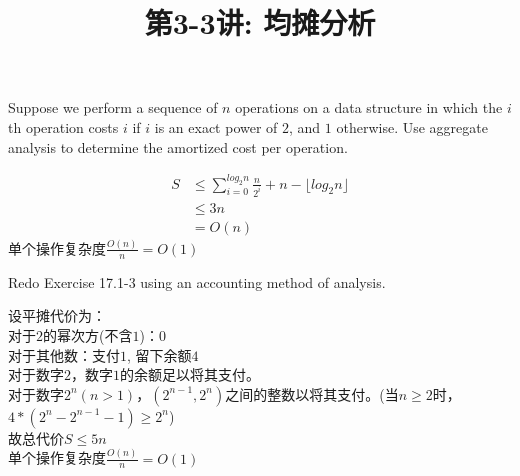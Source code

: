 \documentclass[a4paper, justified]{tufte-handout}
\title{第3-3讲: 均摊分析}
\date{\zhtoday} %
\begin{document}
\maketitle
\noplagiarism %
\begin{abstract}
\end{abstract}
\beginrequired

\begin{problem}[TC 17.1-3]
Suppose we perform a sequence of $n$ operations on a data structure in which the $i$ th operation costs $i$ if $i$ is an exact power of $2$, and $1$ otherwise. Use aggregate analysis to determine the amortized cost per operation.
\end{problem}

\begin{solution}
    \[
        \begin{aligned}
            S & \leq\sum\limits_{i = 0}^{log_2n}\frac{n}{2^i} + n - \lfloor log_2n\rfloor \\
              & \leq 3n                                                                   \\
              & = O(n)
        \end{aligned}
    \]
    单个操作复杂度$\frac{O(n)}{n}=O(1)$
\end{solution}

\begin{problem}[TC 17.2-2]
Redo Exercise 17.1-3 using an accounting method of analysis.
\end{problem}

\begin{solution}
    设平摊代价为：\\
    对于$2$的幂次方(不含$1$)：0\\
    对于其他数：支付$1$, 留下余额$4$\\
    对于数字$2$，数字$1$的余额足以将其支付。\\
    对于数字$2^n(n>1)$，$(2^{n-1},2^n)$之间的整数以将其支付。(当$n\geq2$时，$4*(2^n-2^{n-1}-1)\geq 2^n$)\\
    故总代价$S\leq 5n$\\
    单个操作复杂度$\frac{O(n)}{n}=O(1)$
\end{solution}
\end{document}
